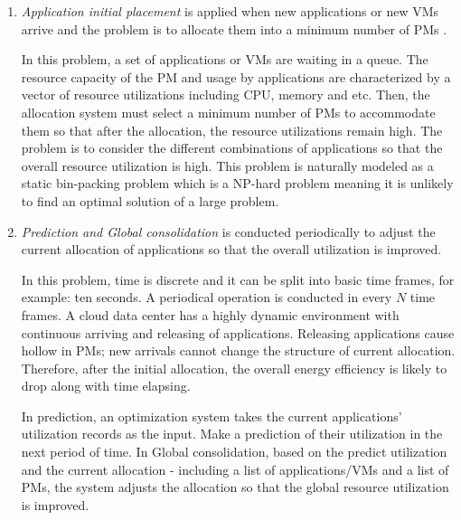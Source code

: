 \begin{enumerate}
	\item \emph{Application initial placement} is applied when new applications or new VMs arrive and the problem is to allocate them into a minimum number of PMs \cite{Mishra:2012kx}.

	In this problem, a set of applications or VMs are waiting in a queue. The resource capacity of the PM and usage by applications are characterized by a vector of resource utilizations including CPU, memory and etc. Then, the allocation system must select a minimum number of PMs to accommodate them so that after the allocation, the resource utilizations remain high. The problem is to consider the different combinations of applications so that the overall resource utilization is high. This problem is naturally modeled as a static bin-packing problem \cite{CoffmanJr:1996ui} which is a NP-hard problem meaning it is unlikely to find an optimal solution of a large problem. 

	\item \emph{Prediction and Global consolidation} is conducted periodically to adjust the current allocation of applications so that the overall utilization is improved.

	In this problem, time is discrete and it can be split into basic time frames, for example: ten seconds. A periodical operation is conducted in every $N$ time frames.
	A cloud data center has a highly dynamic environment with continuous arriving and releasing of applications. Releasing applications cause hollow in PMs; new arrivals cannot change the structure of current allocation. Therefore, after the initial allocation, the overall energy efficiency is likely to drop along with time elapsing. 

	In prediction, an optimization system takes  the current applications' utilization records as the input. Make a prediction of their utilization in the next period of time. 
	In Global consolidation, based on the predict utilization and the current allocation - including a list of applications/VMs and a list of PMs, the system adjusts the allocation so that the global resource utilization is improved.


\end{enumerate}
